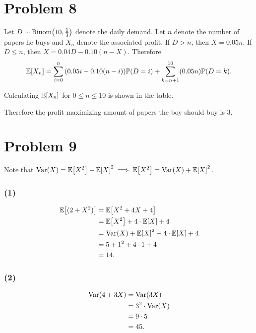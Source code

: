 \documentclass[12pt]{extarticle}
\begin{document}
\section*{Problem 8}
Let $D \sim \text{Binom}\qty(10, \frac{1}{3})$ denote the daily demand. Let $n$ denote the number of papers he buys and $X_n$ denote the associated profit. If $D > n$, then $X = 0.05 n$. If $D \leq n$, then $X = 0.04 D - 0.10(n - X)$. Therefore
\[
	\mathbb{E}\qty[X_n] = \sum_{i=0}^{n} \qty(0.05 i - 0.10(n - i)) \mathbb{P}\qty(D = i) + \sum_{k=n+1}^{10} (0.05 n) \mathbb{P}\qty(D = k)
.\]

Calculating $\mathbb{E}\qty[X_n]$ for $0 \leq n \leq 10$ is shown in the table.
\begin{figure}[h!]
	\centering
	
\end{figure}
Therefore the profit maximizing amount of papers the boy should buy is $3$.

\section*{Problem 9}
Note that $\text{Var}\qty(X) = \mathbb{E}\qty[X^2] - \mathbb{E}\qty[X]^2 \implies \mathbb{E}\qty[X^2] = \text{Var}\qty(X) + \mathbb{E}\qty[X]^2$. \\

\begin{multicols}{2}
\subsubsection*{(1)}
\begin{align*}
	\mathbb{E}\qty[(2+X^2)] &= \mathbb{E}\qty[X^2 + 4X + 4] \\
								&= \mathbb{E}\qty[X^2] + 4\cdot\mathbb{E}\qty[X] + 4 \\
								&= \text{Var}\qty(X) + \mathbb{E}\qty[X]^2 + 4\cdot\mathbb{E}\qty[X] + 4 \\
								&= 5 + 1^2 + 4\cdot 1 + 4 \\
								&= 14
.\end{align*}
\columnbreak
\subsubsection*{(2)}
\begin{align*}
	\text{Var}\qty(4 + 3X) &= \text{Var}\qty(3X) \\
							 &= 3^2 \cdot \text{Var}\qty(X) \\
							 &= 9 \cdot 5 \\ 
							 &= 45
.\end{align*}
\end{multicols}
\end{document}
